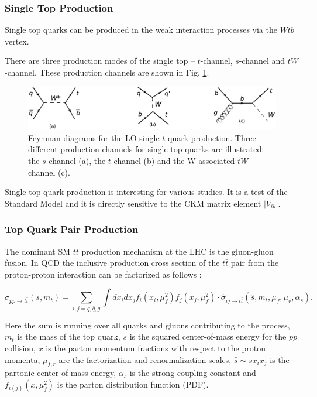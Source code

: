 \subsubsection{Single Top Production}

Single top quarks can be produced in the weak interaction processes via the $Wtb$ vertex.

There are three production modes of the single top -- $t$-channel, $s$-channel and $tW$-channel. These production channels are shown in Fig. \ref{fig:single_t_prod}.

\begin{figure}[H]
  \centering
  \includegraphics[width=1.0\textwidth]{01_Theory_SM/plots/single_top_uniform.png}
  \caption{Feynman diagrams for the LO single $t$-quark production. Three different production channels for single top quarks are illustrated: 
  the $s$-channel (a), the $t$-channel (b) and the W-associated $tW$-channel (c).}
  \label{fig:single_t_prod}
\end{figure}

Single top quark production is interesting for various studies. It is a test of the Standard Model and it is directly sensitive to the CKM matrix
element $|V_{tb}|$.

\subsubsection{Top Quark Pair Production}\label{ssec:tt_prod}

The dominant SM $t\bar{t}$ production mechanism at the LHC is the gluon-gluon fusion. In QCD the inclusive production cross section of the $t\bar{t}$ pair
from the proton-proton interaction can be factorized as follows \cite{Schilling:2012dx}:

\begin{equation} \label{eq:pptt}
 \sigma_{pp \rightarrow t\bar{t}} (s, m_{t}) = \sum_{i,j = q, \bar{q}, g} \int dx_{i} dx_{j} f_{i}(x_{i}, \mu_{f}^{2}) f_{j}(x_{j}, \mu_{f}^{2}) \cdot \hat{\sigma}_{ij \rightarrow t\bar{t}}(\hat{s}, m_{t}, \mu_{f}, \mu_{r}, \alpha_{s}).
\end{equation}

Here the sum is running over all quarks and gluons contributing to the process, $m_{t}$ is the mass of the top quark, $s$ is the squared center-of-mass 
energy for the $pp$ collision, $x$ is the parton momentum fractions with respect to the proton momenta, $\mu_{f,r}$ are the factorization and renormalization 
scales, $\hat{s} \sim sx_{i}x_{j}$ is the partonic center-of-mass energy, $\alpha_{s}$ is the strong coupling constant and  $f_{i(j)}(x, \mu_{f}^{2})$ is the parton distribution
function (PDF). 


